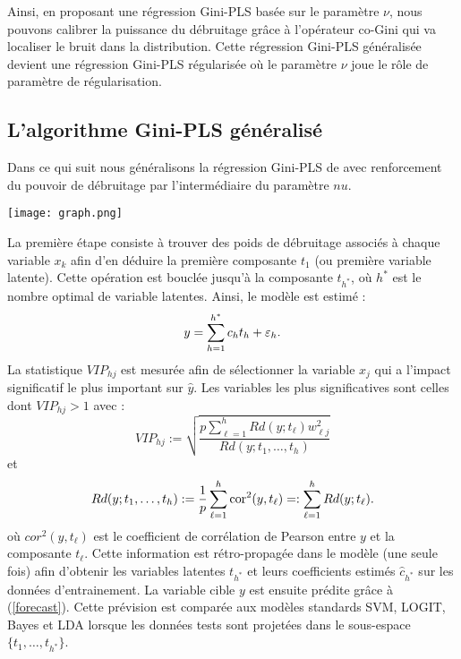 Ainsi, en proposant une régression Gini-PLS basée sur le paramètre $\nu$, nous pouvons calibrer la puissance du débruitage  grâce à l'opérateur co-Gini qui va localiser le bruit dans la distribution. Cette régression Gini-PLS généralisée devient une régression Gini-PLS régularisée où le paramètre $\nu$ joue le rôle de paramètre de régularisation. 


\subsection{L'algorithme Gini-PLS généralisé} 

Dans ce qui suit nous généralisons la régression Gini-PLS de \citet{mussard2018ginipls} avec renforcement du pouvoir de débruitage par l'intermédiaire du paramètre $nu$.


\begin{center}
	\texttt{[image: graph.png]}
\end{center}


La première étape consiste à trouver des poids de débruitage associés à chaque variable $x_k$ afin d'en déduire la première composante $t_1$ (ou première variable latente). Cette opération est bouclée jusqu'à la composante $t_{h^*}$, où $h^*$ est le nombre optimal de variable latentes. Ainsi, le modèle est estimé :
\begin{equation}\label{forecast}
y=\sum_{h=1}^{h^*} c_ht_h +\varepsilon_h.
\end{equation}   
La statistique $VIP_{hj}$ est mesurée afin de sélectionner la variable $x_j$ qui a l'impact significatif le plus important sur $\hat{y}$. Les variables les plus significatives sont celles dont $VIP_{hj}>1$ avec :
\[
VIP_{hj} := \sqrt{\frac{p\sum_{\ell=1}^{h}Rd(y;t_\ell)w_{\ell j}^2}{Rd(y;t_1,\ldots,t_h)}} 
\] 
et 
\[
Rd(y; t_1,\ldots,t_h) := \frac{1}{p}\sum_{\ell=1}^{h}\text{cor}^2(y,t_\ell) =: \sum_{\ell=1}^{h}Rd(y;t_\ell).
\]
où $cor^2(y,t_\ell)$ est le coefficient de corrélation de Pearson entre $y$ et la composante $t_\ell$. Cette information est rétro-propagée dans le modèle (une seule fois) afin d'obtenir les variables latentes $t_{h^*}$ et leurs coefficients estimés $\hat{c}_{h^*}$ sur les données d'entrainement. La variable cible $y$ est ensuite prédite grâce à (\ref{forecast}). Cette prévision est comparée aux modèles standards SVM, LOGIT, Bayes et LDA lorsque les données tests sont projetées dans le sous-espace $\{t_1,\ldots,t_{h^*}\}$.\\


